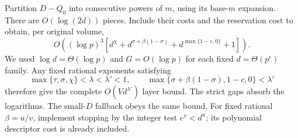 Partition $D-Q_0$ into consecutive powers of $m$, using its base-$m$
expansion. There are $O(\log(2d))$ pieces. Include their costs and the
reservation cost to obtain, per original volume,
\[
 O\!\left((\log p)^3
 [d^\chi+d^{\sigma+\beta(1-\sigma)}+d^{\max\{1-c,0\}}+1]\right).
\]
We used $\log d=\Theta(\log p)$ and $G=O(\log p)$ for each fixed
$d=\Theta(p^\epsilon)$ family. Any fixed rational exponents satisfying
\[
 \max\{\tau,\sigma,\chi\}<\lambda<\lambda'<1,\qquad
 \max\{\sigma+\beta(1-\sigma),1-c,0\}<\lambda'
\]
therefore give the complete $O(Vd^{\lambda'})$ layer bound. The strict gaps
absorb the logarithms. The small-$D$ fallback obeys the same bound.
For fixed rational $\beta=u/v$, implement stopping by the integer test
$e^v<d^u$; its polynomial descriptor cost is already included.
